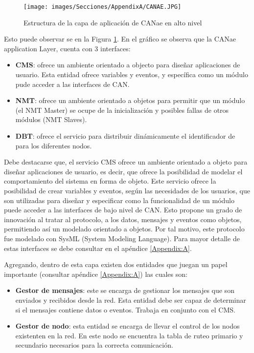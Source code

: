\begin{figure}[h!]
 \centering
 \texttt{[image: images/Secciones/AppendixA/CANAE.JPG]}
  \caption{Estructura de la capa de aplicación de CANae en alto nivel}
\label{fig:CANAEC4}
\end{figure}

Esto puede observar se en la Figura \ref{fig:CANAEC4}. En el gráfico se observa que
la CANae application Layer, cuenta con 3 interfaces:
\begin{itemize}
\item \textbf{CMS}: ofrece un ambiente orientado a objecto para diseñar aplicaciones de usuario.
  Esta entidad ofrece variables y eventos, y específica como un módulo pude acceder a
las interfaces de CAN.
\item \textbf{NMT}: ofrece un ambiente orientado a objetos para permitir que un módulo (el
NMT Master) se ocupe de la inicialización y posibles fallas de otros módulos (NMT Slaves).
\item \textbf{DBT}: ofrece el servicio para distribuir dinámicamente el identificador de para los diferentes nodos.
\end{itemize}
Debe destacarse que, el servicio CMS ofrece un ambiente orientado a objeto  para diseñar
aplicaciones de usuario, es decir, que ofrece la posibilidad de modelar el
comportamiento del sistema en forma de objeto. Este servicio ofrece la posibilidad
de crear variables y eventos, según las necesidades de los usuarios, que son
utilizadas para diseñar y especificar como la funcionalidad de un módulo puede
acceder a las interfaces de bajo nivel de CAN. Esto propone un grado de innovación
al tratar al protocolo, a los datos, mensajes y eventos como objetos, permitiendo así
un modelado orientado a objetos. Por tal motivo, este protocolo fue modelado
con SysML (System Modeling Language).
Para mayor detalle de estas interfaces se debe consultar en el apéndice \ref{Appendix:A}.

Agregando, dentro de esta capa existen dos entidades que juegan un papel importante
(consultar apéndice \ref{Appendix:A}) las cuales son:
\begin{itemize}
\item \textbf{Gestor de mensajes}: este se encarga de gestionar los mensajes que son enviados y recibidos desde la red.
Esta entidad debe ser capaz de determinar si el mensajes contiene datos o eventos. Trabaja en conjunto
con el CMS.
\item \textbf{Gestor de nodo}: esta entidad se encarga de llevar el control de los nodos existenten en la red. En este
nodo se encuentra la tabla de ruteo primario y secundario necesarios para la correcta comunicación.
\end{itemize}

